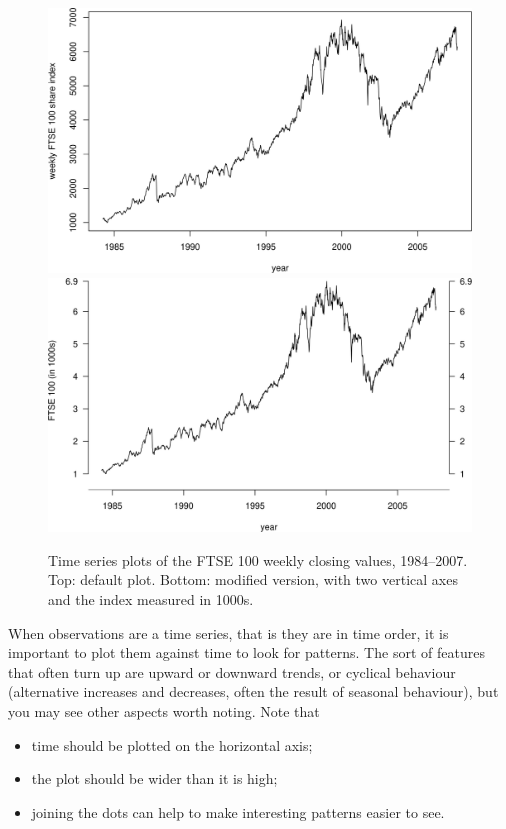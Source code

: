 \documentclass[
  11pt,
  british,
  openany, a4paper]{book}
\providecommand{\tightlist}{%
  \setlength{\itemsep}{0pt}\setlength{\parskip}{0pt}}
\begin{document}
\begin{figure}

{\centering \includegraphics[width=0.75\linewidth]{images/ftse_weekly} \includegraphics[width=0.75\linewidth]{images/ftse_weekly_tufte} 

}

\caption{Time series plots of the FTSE 100 weekly closing values, 1984--2007.  Top: default plot.  Bottom: modified version, with two vertical axes and the index measured in 1000s.}\label{fig:ftsenew}
\end{figure}

When observations are a time series, that is they are in time order, it is important to plot them against time to look for patterns. The sort of features that often turn up are upward or downward trends, or cyclical behaviour (alternative increases and decreases, often the result of seasonal behaviour),
but you may see other aspects worth noting. Note that

\begin{itemize}
\tightlist
\item
  time should be plotted on the horizontal axis;
\item
  the plot should be wider than it is high;
\item
  joining the dots can help to make interesting patterns easier to see.
\end{itemize}
\end{document}
